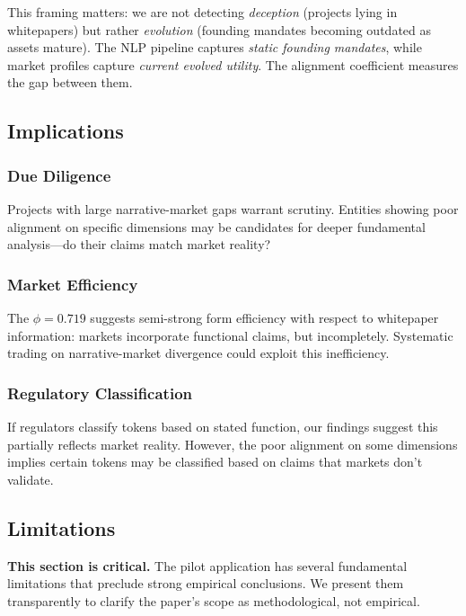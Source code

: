 \documentclass[11pt,twocolumn]{article}
\begin{document}
This framing matters: we are not detecting \textit{deception} (projects lying in whitepapers) but rather \textit{evolution} (founding mandates becoming outdated as assets mature). The NLP pipeline captures \textit{static founding mandates}, while market profiles capture \textit{current evolved utility}. The alignment coefficient measures the gap between them.

\subsection{Implications}

\subsubsection{Due Diligence}

Projects with large narrative-market gaps warrant scrutiny. Entities showing poor alignment on specific dimensions may be candidates for deeper fundamental analysis---do their claims match market reality?

\subsubsection{Market Efficiency}

The $\phi = 0.719$ suggests semi-strong form efficiency with respect to whitepaper information: markets incorporate functional claims, but incompletely. Systematic trading on narrative-market divergence could exploit this inefficiency.

\subsubsection{Regulatory Classification}

If regulators classify tokens based on stated function, our findings suggest this partially reflects market reality. However, the poor alignment on some dimensions implies certain tokens may be classified based on claims that markets don't validate.

\subsection{Limitations}

\textbf{This section is critical.} The pilot application has several fundamental limitations that preclude strong empirical conclusions. We present them transparently to clarify the paper's scope as methodological, not empirical.
\end{document}
